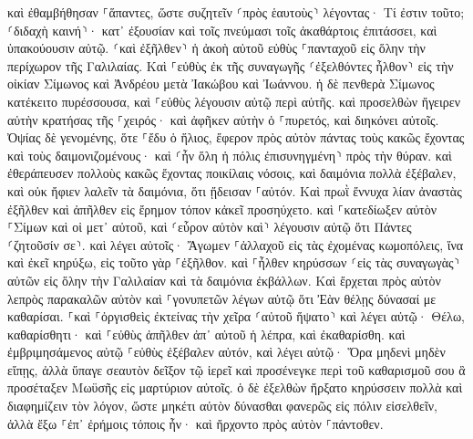 \documentclass[twoside, 9pt]{extreport}
\begin{document}
καὶ ἐθαμβήθησαν ⸀ἅπαντες, ὥστε συζητεῖν ⸂πρὸς ἑαυτοὺς⸃ λέγοντας· Τί ἐστιν τοῦτο; ⸂διδαχὴ καινή⸃· κατ᾽ ἐξουσίαν καὶ τοῖς πνεύμασι τοῖς ἀκαθάρτοις ἐπιτάσσει, καὶ ὑπακούουσιν αὐτῷ. 
⸂καὶ ἐξῆλθεν⸃ ἡ ἀκοὴ αὐτοῦ εὐθὺς ⸀πανταχοῦ εἰς ὅλην τὴν περίχωρον τῆς Γαλιλαίας. 
Καὶ ⸀εὐθὺς ἐκ τῆς συναγωγῆς ⸂ἐξελθόντες ἦλθον⸃ εἰς τὴν οἰκίαν Σίμωνος καὶ Ἀνδρέου μετὰ Ἰακώβου καὶ Ἰωάννου. 
ἡ δὲ πενθερὰ Σίμωνος κατέκειτο πυρέσσουσα, καὶ ⸀εὐθὺς λέγουσιν αὐτῷ περὶ αὐτῆς. 
καὶ προσελθὼν ἤγειρεν αὐτὴν κρατήσας τῆς ⸀χειρός· καὶ ἀφῆκεν αὐτὴν ὁ ⸀πυρετός, καὶ διηκόνει αὐτοῖς. 
Ὀψίας δὲ γενομένης, ὅτε ⸀ἔδυ ὁ ἥλιος, ἔφερον πρὸς αὐτὸν πάντας τοὺς κακῶς ἔχοντας καὶ τοὺς δαιμονιζομένους· 
καὶ ⸂ἦν ὅλη ἡ πόλις ἐπισυνηγμένη⸃ πρὸς τὴν θύραν. 
καὶ ἐθεράπευσεν πολλοὺς κακῶς ἔχοντας ποικίλαις νόσοις, καὶ δαιμόνια πολλὰ ἐξέβαλεν, καὶ οὐκ ἤφιεν λαλεῖν τὰ δαιμόνια, ὅτι ᾔδεισαν ⸀αὐτόν. 
Καὶ πρωῒ ἔννυχα λίαν ἀναστὰς ἐξῆλθεν καὶ ἀπῆλθεν εἰς ἔρημον τόπον κἀκεῖ προσηύχετο. 
καὶ ⸀κατεδίωξεν αὐτὸν ⸀Σίμων καὶ οἱ μετ᾽ αὐτοῦ, 
καὶ ⸂εὗρον αὐτὸν καὶ⸃ λέγουσιν αὐτῷ ὅτι Πάντες ⸂ζητοῦσίν σε⸃. 
καὶ λέγει αὐτοῖς· Ἄγωμεν ⸀ἀλλαχοῦ εἰς τὰς ἐχομένας κωμοπόλεις, ἵνα καὶ ἐκεῖ κηρύξω, εἰς τοῦτο γὰρ ⸀ἐξῆλθον. 
καὶ ⸀ἦλθεν κηρύσσων ⸂εἰς τὰς συναγωγὰς⸃ αὐτῶν εἰς ὅλην τὴν Γαλιλαίαν καὶ τὰ δαιμόνια ἐκβάλλων. 
Καὶ ἔρχεται πρὸς αὐτὸν λεπρὸς παρακαλῶν αὐτὸν καὶ ⸀γονυπετῶν λέγων αὐτῷ ὅτι Ἐὰν θέλῃς δύνασαί με καθαρίσαι. 
⸀καὶ ⸀ὀργισθεὶς ἐκτείνας τὴν χεῖρα ⸂αὐτοῦ ἥψατο⸃ καὶ λέγει αὐτῷ· Θέλω, καθαρίσθητι· 
καὶ ⸀εὐθὺς ἀπῆλθεν ἀπ᾽ αὐτοῦ ἡ λέπρα, καὶ ἐκαθαρίσθη. 
καὶ ἐμβριμησάμενος αὐτῷ ⸀εὐθὺς ἐξέβαλεν αὐτόν, 
καὶ λέγει αὐτῷ· Ὅρα μηδενὶ μηδὲν εἴπῃς, ἀλλὰ ὕπαγε σεαυτὸν δεῖξον τῷ ἱερεῖ καὶ προσένεγκε περὶ τοῦ καθαρισμοῦ σου ἃ προσέταξεν Μωϋσῆς εἰς μαρτύριον αὐτοῖς. 
ὁ δὲ ἐξελθὼν ἤρξατο κηρύσσειν πολλὰ καὶ διαφημίζειν τὸν λόγον, ὥστε μηκέτι αὐτὸν δύνασθαι φανερῶς εἰς πόλιν εἰσελθεῖν, ἀλλὰ ἔξω ⸀ἐπ᾽ ἐρήμοις τόποις ἦν· καὶ ἤρχοντο πρὸς αὐτὸν ⸀πάντοθεν. 
\end{document}
